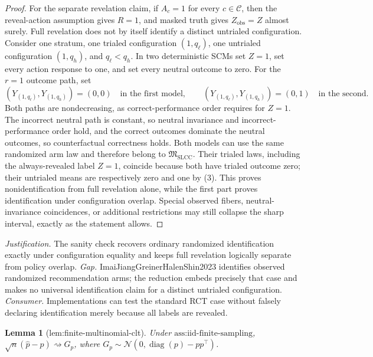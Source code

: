 \documentclass{article}
\newtheorem{lemma}{Lemma}
\begin{document}
\begin{proof}
For the separate revelation claim, if \(A_c=1\) for every \(c\in\mathcal C\), then the reveal-action assumption gives \(R=1\), and masked truth gives \(Z_{\mathrm{obs}}=Z\) almost surely.  Full revelation does not by itself identify a distinct untrialed configuration.  Consider one stratum, one trialed configuration \((1,q_\ell)\), one untrialed configuration \((1,q_h)\), and \(q_\ell<q_h\).  In two deterministic SCMs set \(Z=1\), set every action response to one, and set every neutral outcome to zero.  For the \(r=1\) outcome path, set
\[
(Y_{(1,q_\ell)},Y_{(1,q_h)})=(0,0)
\quad\text{in the first model},
\qquad
(Y_{(1,q_\ell)},Y_{(1,q_h)})=(0,1)
\quad\text{in the second}.
\tag{3}
\]
Both paths are nondecreasing, as correct-performance order requires for \(Z=1\).  The incorrect neutral path is constant, so neutral invariance and incorrect-performance order hold, and the correct outcomes dominate the neutral outcomes, so counterfactual correctness holds.  Both models can use the same randomized arm law and therefore belong to \(\mathfrak M_{\mathrm{SLCC}}\).  Their trialed laws, including the always-revealed label \(Z=1\), coincide because both have trialed outcome zero; their untrialed means are respectively zero and one by (3).  This proves nonidentification from full revelation alone, while the first part proves identification under configuration overlap.  Special observed fibers, neutral-invariance coincidences, or additional restrictions may still collapse the sharp interval, exactly as the statement allows.
\end{proof}
\par\smallskip\noindent \textit{Justification.} The sanity check recovers ordinary randomized identification exactly under configuration equality and keeps full revelation logically separate from policy overlap. \textit{Gap.} ImaiJiangGreinerHalenShin2023 identifies observed randomized recommendation arms; the reduction embeds precisely that case and makes no universal identification claim for a distinct untrialed configuration. \textit{Consumer.} Implementations can test the standard RCT case without falsely declaring identification merely because all labels are revealed.

\begin{lemma}[lem:finite-multinomial-clt]\label{lem:finite-multinomial-clt}
Under \(\text{ass:iid-finite-sampling}\), \(\sqrt n(\widehat p-p)\rightsquigarrow G_p\), where \(G_p\sim\mathcal N(0,\operatorname{diag}(p)-pp^{\top})\).
\end{lemma}
\end{document}
